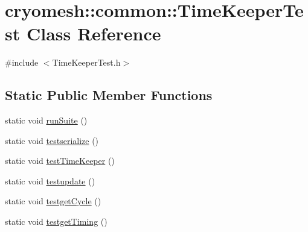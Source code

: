 \hypertarget{classcryomesh_1_1common_1_1_time_keeper_test}{
\section{cryomesh::common::TimeKeeperTest Class Reference}
\label{classcryomesh_1_1common_1_1_time_keeper_test}
}


{\ttfamily \#include $<$TimeKeeperTest.h$>$}

\subsection*{Static Public Member Functions}
\begin{DoxyCompactItemize}
\item 
static void \hyperlink{classcryomesh_1_1common_1_1_time_keeper_test_a33e9aabb114393a14fa3fdaaae5954f2}{runSuite} ()
\item 
static void \hyperlink{classcryomesh_1_1common_1_1_time_keeper_test_ade7f64b633ec6b7f5bb33244c6a99354}{testserialize} ()
\item 
static void \hyperlink{classcryomesh_1_1common_1_1_time_keeper_test_aa27cea26c5d307be18d72537a32b369d}{testTimeKeeper} ()
\item 
static void \hyperlink{classcryomesh_1_1common_1_1_time_keeper_test_a26191e841ffcbf2a28907bd3ca9cbb28}{testupdate} ()
\item 
static void \hyperlink{classcryomesh_1_1common_1_1_time_keeper_test_a32e20cfa590549737e4eef71cd85a3fe}{testgetCycle} ()
\item 
static void \hyperlink{classcryomesh_1_1common_1_1_time_keeper_test_adde2577c9f9af996f8d20e5c8a75a528}{testgetTiming} ()
\end{DoxyCompactItemize}


